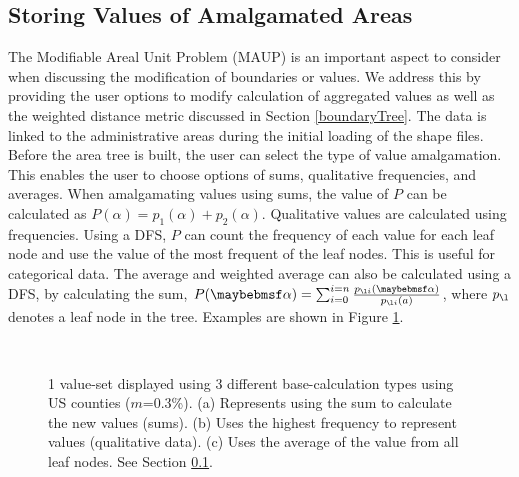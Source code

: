 \subsection{Storing Values of Amalgamated Areas} \label{sec:value}
The Modifiable Areal Unit Problem (MAUP) \cite{openshaw1984modifiable} is an important aspect to consider when discussing the modification of boundaries or values. We address this by providing the user options to modify calculation of aggregated values as well as the weighted distance metric discussed in Section \ref{boundaryTree}. The data is linked to the administrative areas during the initial loading of the shape files. Before the area tree is built, the user can select the type of value amalgamation. This enables the user to choose options of sums, qualitative frequencies, and averages.  When amalgamating values using sums, the value of $P$ can be calculated as $P(\alpha) = p_1(\alpha)+p_2(\alpha)$. Qualitative values are calculated using frequencies. Using a DFS, $P$ can count the frequency of each value for each leaf node and use the value of the most frequent of the leaf nodes. This is useful for categorical data. The average and weighted average  can also be calculated using a DFS, by calculating the sum, $P(\alpha) = \sum_{i=0}^{i=n} \frac{p_{\l  i}(\alpha)}{p_{\l i}(a)}$, where $p_{\l} $ denotes a leaf node in the tree. Examples are shown in Figure \ref{fig:valueCalc}.

\begin{figure}[t]
\centering
{}~~
~~
~~
\caption{ 1 value-set displayed using 3 different base-calculation types using US counties ($m$=0.3\%). (a) Represents using the sum to calculate the new values (sums). (b) Uses the highest frequency to represent values (qualitative data). (c) Uses the average of the value from all leaf nodes.  See Section \ref{sec:value}. } \label{fig:valueCalc} \vspace{-0.2cm}
\end{figure}

